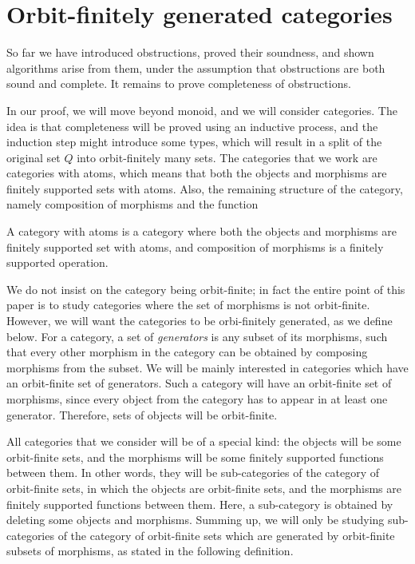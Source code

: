 
\section{Orbit-finitely generated categories}
\label{sec:orbit-finitely-generated-categories}

So far we have introduced obstructions, proved their soundness, and shown algorithms arise from them, under the assumption that obstructions are both sound and complete. It remains to prove completeness of obstructions. 


In our proof, we will move beyond monoid, and we will consider categories. The idea is that completeness will be proved using an inductive process, and the induction step might introduce some types, which will result in a split of the original set $Q$ into orbit-finitely many sets. The categories that we work are categories with atoms, which means that both the objects and morphisms are finitely supported sets with atoms. Also, the remaining structure of the category, namely composition of morphisms and the function 

\begin{definition}
    A category with atoms is a category where both the objects and morphisms are  finitely supported set with atoms, and  composition of morphisms is a finitely supported operation.
\end{definition}

We do not insist on the category being orbit-finite; in fact the entire point of this paper is to study categories where the set of morphisms is not orbit-finite. However, we will want the categories to be orbi-finitely generated, as we define below. For a category, a set of \emph{generators} is any subset of its morphisms, such that every other morphism in the category can be obtained by composing morphisms from the subset.  We will be mainly interested in categories which have an orbit-finite set of generators. Such  a category  will have an orbit-finite set of morphisms, since every object from the category has to appear in at least one generator. Therefore, sets of objects will be orbit-finite.  

All categories that we consider will be of a special kind: the objects will be some orbit-finite sets, and the morphisms will be some finitely supported functions between them. In other words, they will  be sub-categories of the category of orbit-finite sets, in which the objects are orbit-finite sets, and the morphisms are finitely supported functions between them. Here, a sub-category is obtained by deleting some objects and morphisms. Summing up, we will only be studying sub-categories of the category of orbit-finite sets which are generated by orbit-finite subsets of morphisms, as stated in the following definition.  
\newcommand{\generate}[1]{\tuple{#1}}



